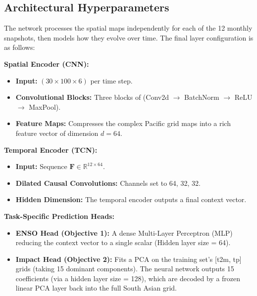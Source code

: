 \subsection{Architectural Hyperparameters}
The network processes the spatial maps independently for each of the 12 monthly snapshots, then models how they evolve over time. The final layer configuration is as follows:

\textbf{Spatial Encoder (CNN):}
\begin{itemize}
    \item \textbf{Input:} $(30 \times 100 \times 6)$ per time step.
    \item \textbf{Convolutional Blocks:} Three blocks of (Conv2d $\rightarrow$ BatchNorm $\rightarrow$ ReLU $\rightarrow$ MaxPool).
    \item \textbf{Feature Maps:} Compresses the complex Pacific grid maps into a rich feature vector of dimension $d=64$.
\end{itemize}

\textbf{Temporal Encoder (TCN):}
\begin{itemize}
    \item \textbf{Input:} Sequence $\mathbf{F} \in \mathbb{R}^{12 \times 64}$.
    \item \textbf{Dilated Causal Convolutions:} Channels set to 64, 32, 32.
    \item \textbf{Hidden Dimension:} The temporal encoder outputs a final context vector.
\end{itemize}

\textbf{Task-Specific Prediction Heads:}
\begin{itemize}
    \item \textbf{ENSO Head (Objective 1):} A dense Multi-Layer Perceptron (MLP) reducing the context vector to a single scalar (Hidden layer size = 64).
    \item \textbf{Impact Head (Objective 2):} Fits a PCA on the training set's [t2m, tp] grids (taking 15 dominant components). The neural network outputs 15 coefficients (via a hidden layer size = 128), which are decoded by a frozen linear PCA layer back into the full South Asian grid.
\end{itemize}

